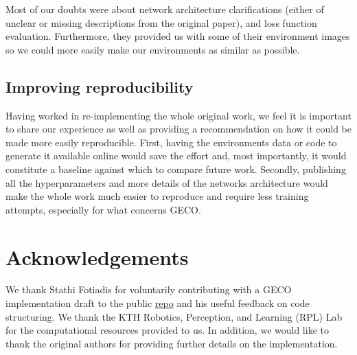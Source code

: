 Most of our doubts were about network architecture clarifications (either of unclear or missing descriptions from the original paper), and loss function evaluation.
Furthermore, they provided us with some of their environment images so we could more easily make our environments as similar as possible.

\subsection{Improving reproducibility}
Having worked in re-implementing the whole original work, we feel it is important to share our experience as well as providing a recommendation on how it could be made more easily reproducible.
First, having the environments data or code to generate it available online would save the effort and, most importantly, it would constitute a baseline against which to compare future work.
Secondly, publishing all the hyperparameters and more details of the networks architecture would make the whole work much easier to reproduce and require less training attempts, especially for what concerns GECO.


\section*{Acknowledgements}
We thank Stathi Fotiadis for voluntarily contributing with a GECO \cite{geco} implementation draft to the public \href{https://github.com/CampusAI/Hamiltonian-Generative-Networks}{repo} and his useful feedback on code structuring. We thank the KTH Robotics, Perception, and Learning (RPL) Lab for the computational resources provided to us.
In addition, we would like to thank the original authors for providing further details on the implementation.